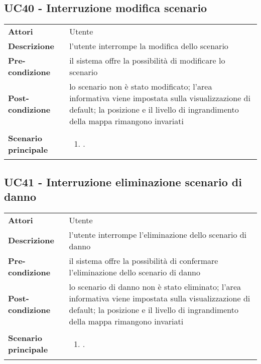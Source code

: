 \subsection{UC40 - Interruzione modifica scenario} 
\label{sssec:UC40} 
\def\arraystretch{1.5}
\begin{tabularx}{\textwidth}{l|p{}}
	\rowcolor{I} \multicolumn{2}{c}{\color{white}\textbf{UC40 - Interruzione modifica scenario}} \\
	\toprule
	\endhead
	\textbf{Attori} & Utente\\
	\textbf{Descrizione} & l'utente interrompe la modifica dello scenario\\
	\textbf{Pre-condizione} & il sistema offre la possibilità di modificare lo scenario\\
	\textbf{Post-condizione} & lo scenario non è stato modificato;  l'area informativa viene impostata sulla visualizzazione di default; la posizione e il livello di ingrandimento della mappa rimangono invariati\\
	\textbf{Scenario principale} & \vspace{-1.2em}\begin{enumerate}[leftmargin=*,noitemsep,nosep]
		\item \nameref{sssec:UC40}.
	\end{enumerate}\\
	\bottomrule
\end{tabularx}
\subsection{UC41 - Interruzione eliminazione scenario di danno} 
\label{sssec:UC41} 
\def\arraystretch{1.5}
\begin{tabularx}{\textwidth}{l|p{}}
	\rowcolor{I} \multicolumn{2}{c}{\color{white}\textbf{UC41 - Interruzione eliminazione scenario di danno}} \\
	\toprule
	\endhead
	\textbf{Attori} & Utente\\
	\textbf{Descrizione} & l'utente interrompe l'eliminazione dello scenario di danno\\
	\textbf{Pre-condizione} & il sistema offre la possibilità di confermare l'eliminazione dello scenario di danno\\
	\textbf{Post-condizione} & lo scenario di danno non è stato eliminato;  l'area informativa viene impostata sulla visualizzazione di default;  la posizione e il livello di ingrandimento della mappa rimangono invariati
	\\
	\textbf{Scenario principale} & \vspace{-1.2em}\begin{enumerate}[leftmargin=*,noitemsep,nosep]
		\item \nameref{sssec:UC41}.
	\end{enumerate}\\
	\bottomrule
\end{tabularx}
